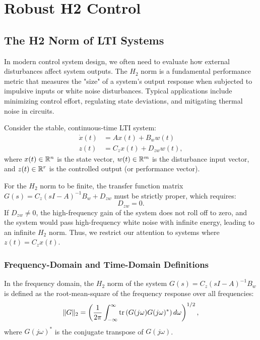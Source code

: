 \chapter{Robust H2 Control}

\section{The H2 Norm of LTI Systems}
In modern control system design, we often need to evaluate how external disturbances affect system outputs. The $H_2$ norm is a fundamental performance metric that measures the "size" of a system's output response when subjected to impulsive inputs or white noise disturbances. Typical applications include minimizing control effort, regulating state deviations, and mitigating thermal noise in circuits.

Consider the stable, continuous-time LTI system:
\begin{align}
    \dot{x}(t) &= A x(t) + B_w w(t) \label{eq:h2_state} \\
    z(t) &= C_z x(t) + D_{zw} w(t) , \label{eq:h2_output}
\end{align}
where $x(t) \in \mathbb{R}^n$ is the state vector, $w(t) \in \mathbb{R}^m$ is the disturbance input vector, and $z(t) \in \mathbb{R}^r$ is the controlled output (or performance vector). 

For the $H_2$ norm to be finite, the transfer function matrix $G(s) = C_z (sI - A)^{-1} B_w + D_{zw}$ must be strictly proper, which requires:
\begin{equation}
D_{zw} = 0 .
\end{equation}
If $D_{zw} \neq 0$, the high-frequency gain of the system does not roll off to zero, and the system would pass high-frequency white noise with infinite energy, leading to an infinite $H_2$ norm. Thus, we restrict our attention to systems where $z(t) = C_z x(t)$.

\subsection{Frequency-Domain and Time-Domain Definitions}
In the frequency domain, the $H_2$ norm of the system $G(s) = C_z (sI - A)^{-1} B_w$ is defined as the root-mean-square of the frequency response over all frequencies:
\begin{equation}
    \| G \|_2 = \left( \frac{1}{2\pi} \int_{-\infty}^{\infty} \operatorname{tr}\left( G(j\omega) G(j\omega)^* \right) d\omega \right)^{1/2} , \label{eq:h2_freq}
\end{equation}
where $G(j\omega)^*$ is the conjugate transpose of $G(j\omega)$.

